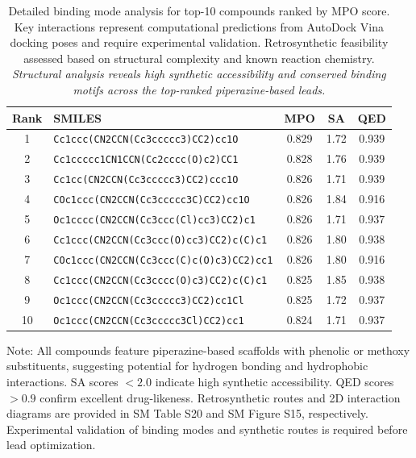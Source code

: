 \documentclass[journal=jcisd8,manuscript=suppinfo]{achemso}
\begin{document}
\begin{table}[htbp]
\centering
\caption{Detailed binding mode analysis for top-10 compounds ranked by MPO score. Key interactions represent computational predictions from AutoDock Vina docking poses and require experimental validation. Retrosynthetic feasibility assessed based on structural complexity and known reaction chemistry. \textit{Structural analysis reveals high synthetic accessibility and conserved binding motifs across the top-ranked piperazine-based leads.}}
\label{tab:top10_binding}
\scriptsize
\begin{tabular}{@{}c p{4.5cm} c c c@{}}
\toprule
\textbf{Rank} & \textbf{SMILES} & \textbf{MPO} & \textbf{SA} & \textbf{QED} \\
\midrule
1 & \texttt{Cc1ccc(CN2CCN(Cc3ccccc3)CC2)cc1O} & \num{0.829} & \num{1.72} & \num{0.939} \\
2 & \texttt{Cc1ccccc1CN1CCN(Cc2cccc(O)c2)CC1} & \num{0.828} & \num{1.76} & \num{0.939} \\
3 & \texttt{Cc1cc(CN2CCN(Cc3ccccc3)CC2)ccc1O} & \num{0.826} & \num{1.71} & \num{0.939} \\
4 & \texttt{COc1ccc(CN2CCN(Cc3ccccc3C)CC2)cc1O} & \num{0.826} & \num{1.84} & \num{0.916} \\
5 & \texttt{Oc1cccc(CN2CCN(Cc3ccc(Cl)cc3)CC2)c1} & \num{0.826} & \num{1.71} & \num{0.937} \\
6 & \texttt{Cc1ccc(CN2CCN(Cc3ccc(O)cc3)CC2)c(C)c1} & \num{0.826} & \num{1.80} & \num{0.938} \\
7 & \texttt{COc1ccc(CN2CCN(Cc3ccc(C)c(O)c3)CC2)cc1} & \num{0.826} & \num{1.80} & \num{0.916} \\
8 & \texttt{Cc1ccc(CN2CCN(Cc3cccc(O)c3)CC2)c(C)c1} & \num{0.825} & \num{1.85} & \num{0.938} \\
9 & \texttt{Oc1ccc(CN2CCN(Cc3ccccc3)CC2)cc1Cl} & \num{0.825} & \num{1.72} & \num{0.937} \\
10 & \texttt{Oc1ccc(CN2CCN(Cc3ccccc3Cl)CC2)cc1} & \num{0.824} & \num{1.71} & \num{0.937} \\
\bottomrule
\end{tabular}
\vspace{0.5em}
\begin{footnotesize}
Note: All compounds feature piperazine-based scaffolds with phenolic or methoxy substituents, suggesting potential for hydrogen bonding and hydrophobic interactions. SA scores $< \num{2.0}$ indicate high synthetic accessibility. QED scores $> \num{0.9}$ confirm excellent drug-likeness. Retrosynthetic routes and 2D interaction diagrams are provided in SM Table S20 and SM Figure S15, respectively. Experimental validation of binding modes and synthetic routes is required before lead optimization.
\end{footnotesize}
\end{table}
\end{document}

